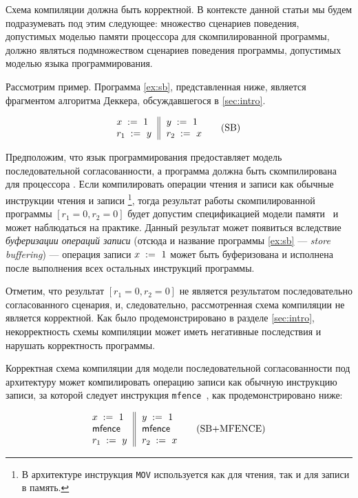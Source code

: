 Схема компиляции должна быть корректной. 
В контексте данной статьи мы будем подразумевать под 
этим следующее: множество сценариев поведения, допустимых
моделью памяти процессора для скомпилированной программы, 
должно являться подмножеством сценариев поведения программы, допустимых 
моделью языка программирования. 

Рассмотрим пример. 
Программа \ref{ex:sb}, представленная ниже, является 
фрагментом алгоритма Деккера, обсуждавшегося  в \cref{sec:intro}.

\begin{equation*}
\inarrII{
   \writeInst{}{x}{1}   \\
   \readInst{}{r_1}{y}  \\
}{
  \writeInst{}{y}{1}   \\
  \readInst{}{r_2}{x}  \\
}
\tag{SB}\label{ex:sb}
\end{equation*}

Предположим, что язык программирования предоставляет 
модель последовательной согласованности, а программа
должна быть скомпилирована для процессора \Intel. 
Если компилировать операции чтения и записи 
как обычные инструкции чтения и записи \Intel \footnote{
В архитектуре \Intel инструкция \texttt{MOV} 
используется как для чтения, так и для записи в память.},
тогда результат работы скомпилированной программы
${[r_1=0, r_2=0]}$ будет допустим спецификацией модели памяти~\Intel
и может наблюдаться на практике. 
Данный результат может появиться вследствие 
\emph{буферизации операций записи}
(отсюда и название программы \ref{ex:sb} --- \emph{store buffering}) ---  
операция записи ${x\;:=_{}\;1}$ может быть буферизована 
и исполнена после выполнения всех остальных инструкций программы. 

Отметим, что результат ${[r_1=0, r_2=0]}$ не является результатом последовательно согласованного сценария,
и, следовательно, рассмотренная схема компиляции не является корректной. 
Как было продемонстрировано в разделе \cref{sec:intro}, 
некорректность схемы компиляции может иметь 
негативные последствия и нарушать корректность программы. 

Корректная схема компиляции для модели последовательной согласованности 
под архитектуру \Intel может компилировать 
операцию записи как обычную инструкцию записи, за которой следует 
инструкция \texttt{mfence}~\cite{Sewell-al:CACM10, Batty-al:POPL11}, 
как продемонстрировано ниже:

\begin{equation*}
\inarrII{
   \writeInst{}{x}{1}   \\
   \mfenceInst          \\
   \readInst{}{r_1}{y}  \\
}{
  \writeInst{}{y}{1}   \\
  \mfenceInst          \\
  \readInst{}{r_2}{x}  \\
}
\tag{SB+MFENCE}\label{ex:sb-mfence}
\end{equation*}

